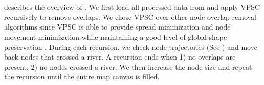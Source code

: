 \section{\software}

 describes the overview of \software. We first load all processed data from  and apply VPSC \cite{dwyer2006fast} recursively to remove overlaps. We chose VPSC over other node overlap removal algorithms since VPSC is able to provide spread minimization and node movement minimization while maintaining a good level of global shape preservation \cite{chen2020Node}. During each recursion, we check node trajectories (See ) and move back nodes that crossed a river. A recursion ends when 1) no overlaps are present; 2) no nodes crossed a river. We then increase the node size and repeat the recursion until the entire map canvas is filled.


